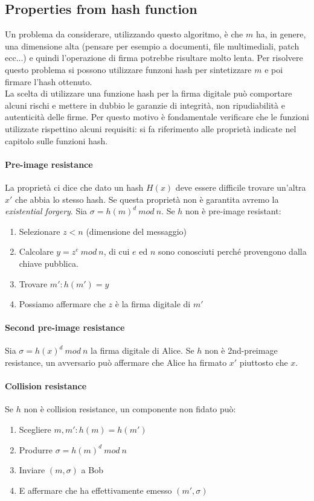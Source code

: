 \documentclass[a4paper,12pt]{article}
\begin{document}
\subsection{Properties from hash function}
Un problema da considerare, utilizzando questo algoritmo, è che $m$ ha, in genere, una dimensione alta (pensare per esempio a documenti, file multimediali, patch ecc...)
e quindi l'operazione di firma potrebbe risultare molto lenta. Per risolvere questo problema si possono utilizzare funzoni hash per sintetizzare $m$ e poi firmare l'hash ottenuto. \\
La scelta di utilizzare una funzione hash per la firma digitale può comportare alcuni rischi e mettere in dubbio le garanzie di integrità, non ripudiabilità e autenticità delle firme.
Per questo motivo è fondamentale verificare che le funzioni utilizzate rispettino alcuni requisiti:
si fa riferimento alle proprietà indicate nel capitolo sulle funzioni hash.
\paragraph{Pre-image resistance}
La proprietà ci dice che dato un hash $H(x)$ deve essere difficile trovare un'altra $x'$ che abbia lo stesso hash.
Se questa proprietà non è garantita avremo la \textit{existential forgery}.
Sia $\sigma = h(m)^d\ mod\ n$. Se $h$ non è pre-image resistant:
\begin{enumerate}
	\item Selezionare $z < n$ (dimensione del messaggio)
	\item Calcolare $y = z^e\ mod\ n$, di cui $e$ ed $n$ sono conosciuti perché provengono dalla chiave pubblica.
	\item Trovare $m' : h(m') = y$
	\item Possiamo affermare che $z$ è la firma digitale di $m'$
\end{enumerate}

\paragraph{Second pre-image resistance}
Sia $\sigma = h(x)^d\ mod\ n$ la firma digitale di Alice. Se $h$ non è 2nd-preimage resistance, un avversario può affermare che Alice ha firmato $x'$ piuttosto che $x$.

\paragraph{Collision resistance}
Se $h$ non è collision resistance, un componente non fidato può:
\begin{enumerate}
	\item Scegliere $m, m' : h(m) = h(m')$
	\item Produrre $\sigma = h(m)^d\ mod\ n$
	\item Inviare $(m, \sigma)$ a Bob
	\item E affermare che ha effettivamente emesso $(m', \sigma)$
\end{enumerate}
\end{document}
